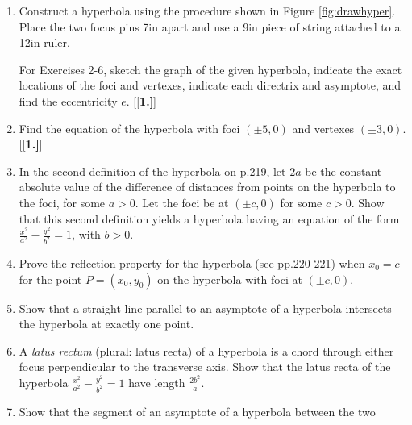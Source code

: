 {\small
{}
\begin{enumerate}[\bfseries 1.]
 \item Construct a hyperbola using the procedure shown in Figure
  \ref{fig:drawhyper}. Place the two focus pins 7in apart and use a 9in piece of
  string attached to a 12in ruler.
\par\noindent For Exercises 2-6, sketch the graph of the given hyperbola,
indicate the exact locations of the foci and vertexes, indicate each directrix
and asymptote, and find the eccentricity $e$.
[{[\bfseries 1.]}]
 \item Find the equation of the hyperbola with foci $(\pm 5,0)$ and vertexes
  $(\pm 3,0)$.
[{[\bfseries 1.]}]
 \item In the second definition of the hyperbola on p.219, let $2a$ be the
  constant absolute value of the difference of distances from points on the
  hyperbola to the foci, for some $a>0$. Let the foci be at $(\pm c,0)$ for
  some $c>0$. Show that this second definition yields a hyperbola having an
  equation of the form $\frac{x^2}{a^2} - \frac{y^2}{b^2}=1$, with $b > 0$.
 \item Prove the reflection property for the hyperbola (see pp.220-221) when
  $x_0=c$ for the point $P=(x_0,y_0)$ on the hyperbola with foci at $(\pm c,0)$.
 \item Show that a straight line parallel to an asymptote of a hyperbola
  intersects the hyperbola at exactly one point.
 \item A \emph{latus rectum}
  (plural: latus recta) of a hyperbola is a chord through either focus
  perpendicular to the transverse axis. Show that the latus recta of the hyperbola
  $\frac{x^2}{a^2} - \frac{y^2}{b^2}=1$ have length $\frac{2b^2}{a}$.
 \item Show that the segment of an asymptote of a hyperbola between the two

\end{enumerate}}
